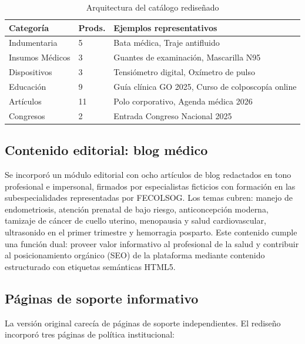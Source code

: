 \documentclass[conference]{IEEEtran}
\begin{document}
\begin{table}[H]
\centering
\caption{Arquitectura del catálogo rediseñado}
\label{tab:catalogo}
\setlength{\tabcolsep}{3pt}
\renewcommand{\arraystretch}{1.2}
\begin{tabular}{|p{2.5cm}|p{1cm}|p{4cm}|}
\hline
\textbf{Categoría} & \textbf{Prods.} & \textbf{Ejemplos representativos} \\
\hline
Indumentaria & 5 & Bata médica, Traje antifluido \\
\hline
Insumos Médicos & 3 & Guantes de examinación, Mascarilla N95 \\
\hline
Dispositivos & 3 & Tensiómetro digital, Oxímetro de pulso \\
\hline
Educación & 9 & Guía clínica GO 2025, Curso de colposcopía online \\
\hline
Artículos & 11 & Polo corporativo, Agenda médica 2026 \\
\hline
Congresos & 2 & Entrada Congreso Nacional 2025 \\
\hline
\end{tabular}
\end{table}

\subsection{Contenido editorial: blog médico}

Se incorporó un módulo editorial con ocho artículos de blog redactados en tono profesional e impersonal, firmados por especialistas ficticios con formación en las subespecialidades representadas por FECOLSOG. Los temas cubren: manejo de endometriosis, atención prenatal de bajo riesgo, anticoncepción moderna, tamizaje de cáncer de cuello uterino, menopausia y salud cardiovascular, ultrasonido en el primer trimestre y hemorragia posparto. Este contenido cumple una función dual: proveer valor informativo al profesional de la salud y contribuir al posicionamiento orgánico (SEO) de la plataforma mediante contenido estructurado con etiquetas semánticas HTML5.

\subsection{Páginas de soporte informativo}

La versión original carecía de páginas de soporte independientes. El rediseño incorporó tres páginas de política institucional:
\end{document}
